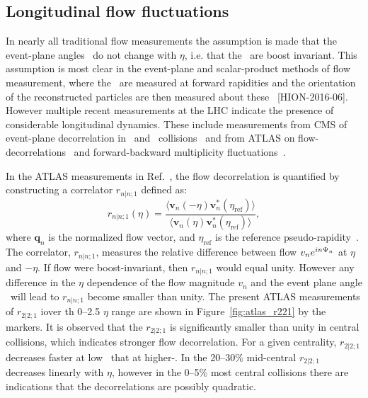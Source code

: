 \subsection{Longitudinal flow fluctuations}

In nearly all traditional flow measurements the assumption is made that the 
  event-plane angles \psin\ do not change with $\eta$, i.e. that the \psin\
  are boost invariant.
This assumption is most clear in the event-plane and scalar-product methods
  of flow measurement,  where the \psin\ are measured at forward rapidities
  and the orientation of the reconstructed particles are then measured about
  these \psin~[HION-2016-06].
However multiple recent measurements at the LHC indicate the presence of 
  considerable longitudinal dynamics.
These include measurements from CMS of event-plane decorrelation in \ppb\ and \pbpb\ 
  collisions~\cite{CMS-HIN-14-012,CMS-HIN-15-008} and from ATLAS on flow-decorrelations~\cite{HION-2016-04}
  and forward-backward multiplicity fluctuations~\cite{HION-2015-13}.


In the ATLAS measurements in Ref.~\cite{HION-2016-04}, the flow decorrelation 
  is quantified by constructing a correlator $r_{n|n;1}$ defined as:
\begin{equation}
r_{n|n;1}(\eta)=%
  \frac{\langle \mathbf{v}_n(-\eta)\mathbf{v}_n^*(\eta_{\mathrm{ref}})\rangle}%
  {\langle \mathbf{v}_n(\eta)\mathbf{v}_n^*(\eta_{\mathrm{ref}})\rangle},
\end{equation}
where $\mathbf{q}_n$ is the normalized flow vector, and $\eta_{\mathrm{ref}}$ is 
  the reference pseudo-rapidity~\cite{HION-2016-04}.
The correlator,  $r_{n|n;1}$,  measures the relative difference between flow
  $v_ne^{in\Psi_{n}}$ at $\eta$ and $-\eta$.
If flow were boost-invariant, then $r_{n|n;1}$ would equal unity.
However any  difference in the $\eta$ dependence of the flow magnitude
  $v_n$ and the event plane angle \psin\ will lead to $r_{n|n;1}$
  become smaller than unity.
The present ATLAS measurements of $r_{2|2;1}$ iover th 0--2.5 $\eta$ range 
  are shown in Figure~\ref{fig:atlas_r221} by the markers. 
It is observed that the $r_{2|2;1}$ is significantly smaller than unity 
  in central collisions, which indicates stronger flow decorrelation.
For a given centrality, $r_{2|2;1}$ decreases faster at low \pt\ 
  that at higher-\pt.
In the 20--30\% mid-central $r_{2|2;1}$ decreases linearly with $\eta$, 
  however in the 0--5\% most central collisions there are indications
  that the decorrelations are possibly quadratic.

